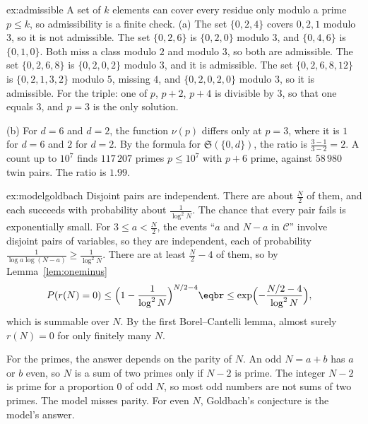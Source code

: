 \begin{solution}{ex:admissible}
\idea A set of $k$ elements can cover every residue only modulo a prime $p\le k$, so admissibility is a finite check.
\writeup (a) The set $\{0,2,4\}$ covers $0,2,1$ modulo $3$, so it is not admissible. The set $\{0,2,6\}$ is $\{0,2,0\}$ modulo $3$, and $\{0,4,6\}$ is $\{0,1,0\}$. Both miss a class modulo $2$ and modulo $3$, so both are admissible.
The set $\{0,2,6,8\}$ is $\{0,2,0,2\}$ modulo $3$, and it is admissible. The set $\{0,2,6,8,12\}$ is $\{0,2,1,3,2\}$ modulo $5$, missing $4$, and $\{0,2,0,2,0\}$ modulo $3$, so it is admissible. For the triple: one of $p$, $p+2$, $p+4$ is divisible by $3$,
so that one equals $3$, and $p=3$ is the only solution.

(b) For $d=6$ and $d=2$, the function $\nu(p)$ differs only at $p=3$, where it is $1$ for $d=6$ and $2$ for $d=2$. By the formula for $\mathfrak S(\{0,d\})$, the ratio is $\frac{3-1}{3-2}=2$. A count up to $10^7$ finds $117\,207$
primes $p\le10^7$ with $p+6$ prime, against $58\,980$ twin pairs. The ratio is $1.99$.
\end{solution}

\begin{solution}{ex:modelgoldbach}
\idea Disjoint pairs are independent. There are about $\frac N2$ of them, and each succeeds with probability about $\frac1{\log^2 N}$. The chance that every pair fails is exponentially small.
\writeup For $3\le a<\frac N2$, the events ``$a$ and $N-a$ in $\mathcal C$'' involve disjoint pairs of variables, so they are independent, each of probability $\frac1{\log a\log(N-a)}\ge\frac1{\log^2N}$. There are at least
$\frac N2-4$ of them, so by Lemma~\ref{lem:oneminus}
\[
\begin{aligned}P(r(N)=0)&\le\Bigl(1-\frac1{\log^2N}\Bigr)^{N/2-4}\eqbr\le\exp\Bigl(-\frac{N/2-4}{\log^2N}\Bigr),\end{aligned}
\]
which is summable over $N$. By the first Borel--Cantelli lemma, almost surely $r(N)=0$ for only finitely many $N$.

For the primes, the answer depends on the parity of $N$. An odd $N=a+b$ has $a$ or $b$ even, so $N$ is a sum of two primes only if $N-2$ is prime. The integer $N-2$ is prime for a proportion $0$ of odd $N$, so most odd numbers are not sums of two primes. The model misses parity. For even $N$, Goldbach's conjecture is the model's answer.
\end{solution}

